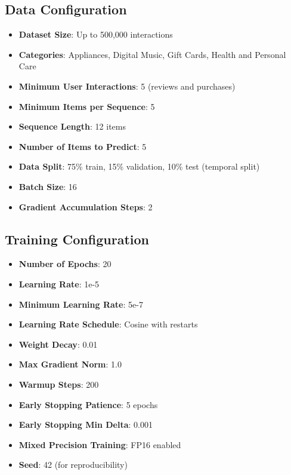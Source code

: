 \documentclass[conference]{IEEEtran}
\begin{document}
\subsection*{Data Configuration}
\begin{itemize}
    \item \textbf{Dataset Size}: Up to 500,000 interactions
    \item \textbf{Categories}: Appliances, Digital Music, Gift Cards, Health and Personal Care
    \item \textbf{Minimum User Interactions}: 5 (reviews and purchases)
    \item \textbf{Minimum Items per Sequence}: 5
    \item \textbf{Sequence Length}: 12 items
    \item \textbf{Number of Items to Predict}: 5
    \item \textbf{Data Split}: 75\% train, 15\% validation, 10\% test (temporal split)
    \item \textbf{Batch Size}: 16
    \item \textbf{Gradient Accumulation Steps}: 2
\end{itemize}

\subsection*{Training Configuration}
\begin{itemize}
    \item \textbf{Number of Epochs}: 20
    \item \textbf{Learning Rate}: 1e-5
    \item \textbf{Minimum Learning Rate}: 5e-7
    \item \textbf{Learning Rate Schedule}: Cosine with restarts
    \item \textbf{Weight Decay}: 0.01
    \item \textbf{Max Gradient Norm}: 1.0
    \item \textbf{Warmup Steps}: 200
    \item \textbf{Early Stopping Patience}: 5 epochs
    \item \textbf{Early Stopping Min Delta}: 0.001
    \item \textbf{Mixed Precision Training}: FP16 enabled
    \item \textbf{Seed}: 42 (for reproducibility)
\end{itemize}
\end{document}
